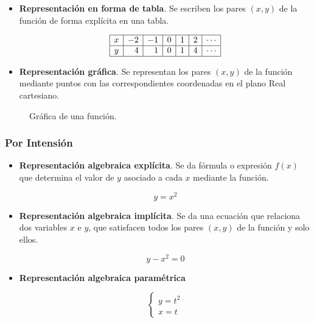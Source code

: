 \documentclass[
  a4paper,
]{scrreport}
\theoremstyle{plain}
\theoremstyle{plain}
\theoremstyle{definition}
\theoremstyle{plain}
\theoremstyle{definition}
\theoremstyle{remark}
\begin{document}
\begin{itemize}
\item
  \textbf{Representación en forma de tabla}. Se escriben los pares
  \((x,y)\) de la función de forma explícita en una tabla.

  \[
    \begin{array}{|c|r|r|r|r|r|r|}
    \hline
    x & -2 & -1 & 0 & 1 & 2 & \cdots \\
    \hline
    y & 4  & 1  & 0 & 1 & 4 & \cdots \\
    \hline
    \end{array}
    \]
\item
  \textbf{Representación gráfica}. Se representan los pares \((x,y)\) de
  la función mediante puntos con las correspondientes coordenadas en el
  plano Real cartesiano.
\end{itemize}

\begin{figure}

{\centering 



}

\caption{Gráfica de una función.}

\end{figure}

\hypertarget{por-intensiuxf3n}{%
\subsubsection*{Por Intensión}\label{por-intensiuxf3n}}

\begin{itemize}
\item
  \textbf{Representación algebraica explícita}. Se da fórmula o
  expresión \(f(x)\) que determina el valor de \(y\) asociado a cada
  \(x\) mediante la función.

  \[y=x^2\]
\item
  \textbf{Representación algebraica implícita}. Se da una ecuación que
  relaciona dos variables \(x\) e \(y\), que satisfacen todos los pares
  \((x,y)\) de la función y solo ellos.

  \[y-x^2=0\]
\item
  \textbf{Representación algebraica paramétrica}

  \[\begin{cases}
    y=t^2\\
    x=t
    \end{cases}
    \]
\end{itemize}
\end{document}
